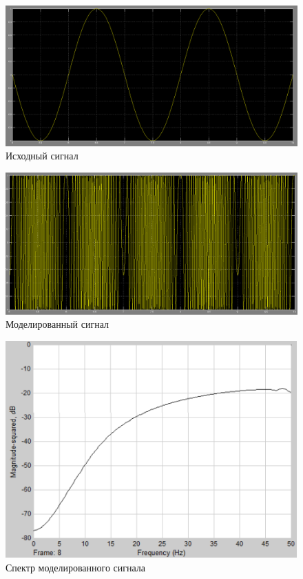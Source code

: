 \begin{figure}[H]

\includegraphics[width=150mm, scale = 0.9]{lab8/8_4}
   \caption{Исходный сигнал}

\end{figure}
\begin{figure}[H]

\includegraphics[width=150mm, scale = 0.9]{lab8/8_5}
   \caption{Моделированный сигнал}

\end{figure}
\begin{figure}[H]

\includegraphics[width=150mm, scale = 0.9]{lab8/8_6}
   \caption{Спектр моделированного сигнала}

\end{figure}
